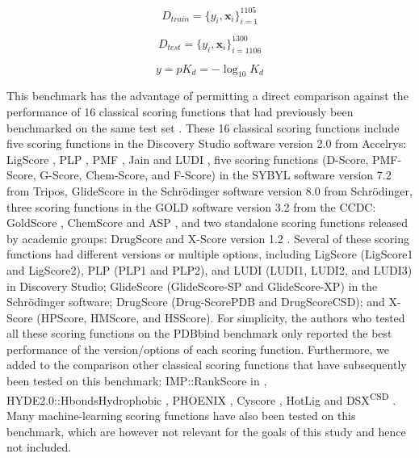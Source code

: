 \begin{equation}
\label{rfscore3:D_train}
D_{train}=\{y_i,\mathbf x_i\}_{i=1}^{1105}
\end{equation}

\begin{equation}
\label{rfscore3:D_test}
D_{test}=\{y_i,\mathbf x_i\}_{i=1106}^{1300}
\end{equation}

\begin{equation}
\label{rfscore3:y}
y=pK_d=-\log_{10}K_d
\end{equation}

This benchmark has the advantage of permitting a direct comparison against the performance of 16 classical scoring functions that had previously been benchmarked on the same test set \citep{1313}. These 16 classical scoring functions include five scoring functions in the Discovery Studio software version 2.0 from Accelrys: LigScore \citep{1466}, PLP \citep{1467}, PMF \citep{1468}, Jain \citep{1473} and LUDI \citep{1463}, five scoring functions (D-Score, PMF-Score, G-Score, Chem-Score, and F-Score) in the SYBYL software version 7.2 from Tripos, GlideScore \citep{1465} in the Schrödinger software version 8.0 from Schrödinger, three scoring functions in the GOLD software version 3.2 from the CCDC: GoldScore \citep{1474}, ChemScore \citep{1464} and ASP \citep{1469}, and two standalone scoring functions released by academic groups: DrugScore \citep{1470,1475} and X-Score version 1.2 \citep{573}. Several of these scoring functions had different versions or multiple options, including LigScore (LigScore1 and LigScore2), PLP (PLP1 and PLP2), and LUDI (LUDI1, LUDI2, and LUDI3) in Discovery Studio; GlideScore (GlideScore-SP and GlideScore-XP) in the Schrödinger software; DrugScore (Drug-ScorePDB and DrugScoreCSD); and X-Score (HPScore, HMScore, and HSScore). For simplicity, the authors who tested all these scoring functions on the PDBbind benchmark \citep{1313} only reported the best performance of the version/options of each scoring function. Furthermore, we added to the comparison other classical scoring functions that have subsequently been tested on this benchmark: IMP::RankScore \citep{987} in \citep{1370}, HYDE2.0::HbondsHydrophobic \citep{1458}, PHOENIX \citep{576}, Cyscore \citep{1372}, HotLig \citep{1459} and DSX\textsuperscript{CSD} \citep{1460}. Many machine-learning scoring functions have also been tested on this benchmark, which are however not relevant for the goals of this study and hence not included.

